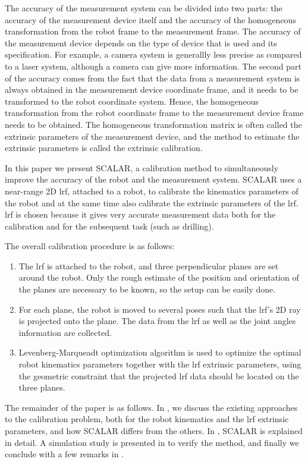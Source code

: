 The accuracy of the measurement system can be divided into two parts: the accuracy of the measurement device itself and the accuracy of the homogeneous transformation from the robot frame to the measurement frame. The accuracy of the measurement device depends on the type of device that is used and its specification. For example, a camera system is generallly less precise as compared to a laser system, although a camera can give more information. The second part of the accuracy comes from the fact that the data from a measurement system is always obtained in the measurement device coordinate frame, and it needs to be transformed to the robot coordinate system. Hence, the homogeneous transformation from the robot coordinate frame to the measurement device frame needs to be obtained. The homogeneous transformation matrix is often called the extrinsic parameters of the measurement device, and the method to estimate the extrinsic parameters is called the extrinsic calibration.  

In this paper we present SCALAR, a calibration method to simultaneously improve the accuracy of the robot and the measurement system. SCALAR uses a near-range 2D \ac{lrf}, attached to a robot, to calibrate the kinematics parameters of the robot and at the same time also calibrate the extrinsic parameters of the \ac{lrf}. \ac{lrf} is chosen because it gives very accurate measurement data both for the calibration and for the subsequent task (such as drilling).  

The overall calibration procedure is as follows:
\begin{enumerate}
\item The \ac{lrf} is attached to the robot, and three perpendicular planes are set around the robot. Only the rough estimate of the position and orientation of the planes are necessary to be known, so the setup can be easily done.
\item For each plane, the robot is moved to several poses such that the \ac{lrf}'s 2D ray is projected onto the plane. The data from the \ac{lrf} as well as the joint angles information are collected.
\item Levenberg-Marqueadt optimization algorithm is used to optimize the optimal robot kinematics parameters together with the \ac{lrf} extrinsic parameters, using the geometric constraint that the projected \ac{lrf} data should be located on the three planes. 
\end{enumerate}

The remainder of the paper is as follows. In , we discuss the existing approaches to the calibration problem, both for the robot kinematics and the \ac{lrf} extrinsic parameters, and how SCALAR differs from the others. In , SCALAR is explained in detail. A simulation study is presented in  to verify the method, and finally we conclude with a few remarks in .  



